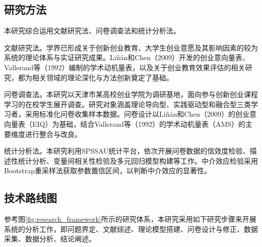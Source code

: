 \subsection{研究方法}

本研究综合运用文献研究法、问卷调查法和统计分析法。

文献研究法。学界已形成关于创新创业教育、大学生创业意愿及其影响因素的较为系统的理论体系与实证研究成果。Liñán和Chen\nolinebreak[3]（2009）开发的创业意向量表\cite{Linan2009}、Vallerand等\nolinebreak[3]（1992）编制的学术动机量表\cite{Vallerand1992}，以及关于创业教育效果评估的相关研究，都为相关领域的理论深化与方法创新奠定了基础。

问卷调查法。本研究以天津市某高校创业学院为调研基地，面向参与创新创业课程学习的在校学生展开调查。研究对象涵盖理论导向型、实践驱动型和融合型三类学习者，采用标准化问卷收集样本数据。问卷设计以Liñán和Chen\nolinebreak[3]（2009）的创业意向量表\nolinebreak[3]（EIQ）为基础\cite{Linan2009}，结合Vallerand等\nolinebreak[3]（1992）的学术动机量表\nolinebreak[3]（AMS）的主要维度进行整合与改良\cite{Vallerand1992}。

统计分析法。本研究利用SPSSAU统计平台，依次开展问卷数据的信效度检验、描述性统计分析、变量间相关性检验及多元回归模型构建等工作。中介效应检验采用Bootstrap重采样法获取参数置信区间，以判断中介效应的显著性。

\subsection{技术路线图}

参考图\ref{fig:research_framework}所示的研究体系，本研究采用如下研究步骤来开展系统的分析工作，即问题界定、文献综述、理论模型搭建、问卷设计与修正、数据采集、数据分析、结论阐述。

